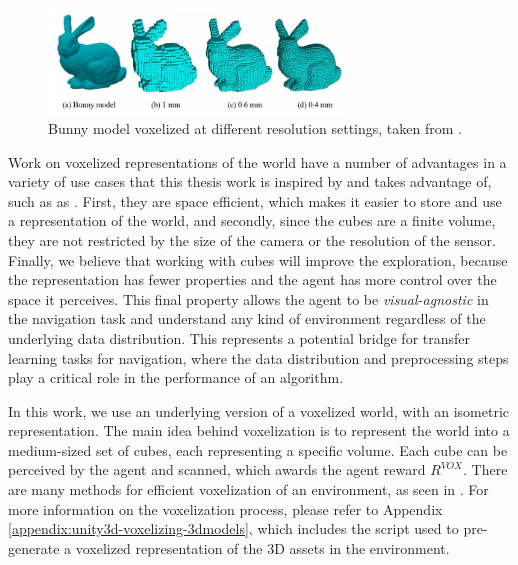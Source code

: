 \begin{figure}[!ht]
        \centering
        \includegraphics[width=0.7\textwidth]{images/bunny-voxelization.png}
        \caption{Bunny model voxelized at different resolution settings, taken from \cite{zhou2020voxelization}.
        }
        \label{fig:open3D-voxelization}
\end{figure}


Work on voxelized representations of the world have a number of advantages in a variety of use cases that this thesis work is inspired by and takes advantage of, such as as \cite{xie2020linking, zhou2020voxelization, dong2004real, loop2013real, orts2016holoportation}. First, they are space efficient, which makes it easier to store and use a representation of the world, and secondly, since the cubes are a finite volume, they are not restricted by the size of the camera or the resolution of the sensor. Finally, we believe that working with cubes will improve the exploration, because the representation has fewer properties and the agent has more control over the space it perceives. This final property allows the agent to be \textit{visual-agnostic} in the navigation task and understand any kind of environment regardless of the underlying data distribution. This represents a potential bridge for transfer learning tasks for navigation, where the data distribution and preprocessing steps play a critical role in the performance of an algorithm.


In this work, we use an underlying version of a voxelized world, with an isometric representation. The main idea behind voxelization is to represent the world into a medium-sized set of cubes, each representing a specific volume. Each cube can be perceived by the agent and scanned, which awards the agent reward $R^{VOX}$.
There are many methods for efficient voxelization of an environment, as seen in \cite{dong2004real, loop2013real, orts2016holoportation}. For more information on the voxelization process, please refer to Appendix \ref{appendix:unity3d-voxelizing-3dmodels}, which includes the script used to pre-generate a voxelized representation of the 3D assets in the environment.


